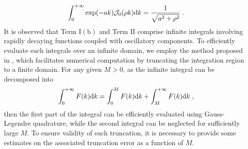 \begin{equation}\label{eq...text...TermI(A)}
    \int_0^{+\infty}   \exp(-ak) \mathcal{J}_0(\rho k)\mathrm{d} k=\frac{1}{\sqrt{a^2+\rho^2}}\;.
\end{equation}
It is observed that Term $\mathrm{I(b)}$ and Term $\mathrm{II}$  comprise infinite integrals involving rapidly decaying functions coupled with oscillatory components. To efficiently evaluate such integrals over an infinite domain, we employ the method proposed in \cite{trefethen2022exactness}, which facilitates numerical computation by truncating the integration region to a finite domain. 
For any given 
$M>0$, as the infinite integral can be decomposed into
\begin{equation*}
 \int_0^{+\infty} F(k)\mathrm{d}  k=  \int_0^{M} F(k)\mathrm{d}  k+\int_M^{+\infty} F(k)\mathrm{d}  k\;,
\end{equation*}
then the first part of the integral can be efficiently evaluated  using  Gauss-Legendre quadrature, while the second integral can be neglected for sufficiently large $M$. To ensure   validity of such truncation, it is necessary to provide some  estimates on the associated truncation error as a function of $M$.
